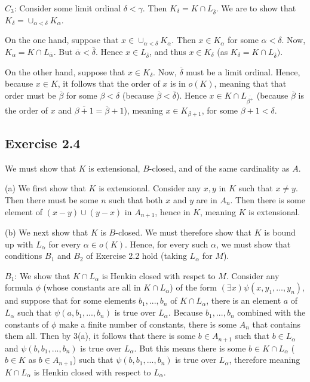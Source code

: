 \documentclass{article}
\theoremstyle{definition}
\begin{document}
$C_3$: Consider some limit ordinal $\delta<\gamma$. Then $K_\delta=K\cap L_{\overline{\delta}}$. We are to show that 
$K_\delta=\cup_{\alpha<\delta}K_\alpha$.

On the one hand, suppose that $x\in\cup_{\alpha<\delta}K_\alpha$. Then $x\in K_\alpha$ for some $\alpha<\delta$. Now, 
$K_\alpha=K\cap L_{\overline{\alpha}}$. But $\overline{\alpha}<\overline{\delta}$. Hence $x\in L_{\overline{\delta}}$, and thus 
$x\in K_\delta$ (as $K_\delta=K\cap L_{\overline{\delta}})$. 

On the other hand, suppose that $x\in K_\delta$. Now, $\overline{\delta}$ must be a limit ordinal. Hence, because 
$x\in K$, it follows that the order of $x$ is in $o(K)$, meaning that that order must be $\overline{\beta}$ for some $\beta<\delta$ (because 
$\overline{\beta}<\overline{\delta}$). 
Hence $x\in K\cap L_{\overline{\beta^+}}$ (because $\overline{\beta}$ is the order of $x$ and $\overline{\beta+1}=\overline{\beta}+1$), 
meaning $x\in K_{\beta+1}$, for some $\beta+1<\delta$.

\subsection*{Exercise 2.4}
We must show that $K$ is extensional, $B$-closed, and of the same cardinality as $A$.

(a) We first show that $K$ is extensional. Consider any $x,y$ in $K$ such that $x\ne y$. Then there must be some $n$ such that 
both $x$ and $y$ are in $A_n$. Then there is some element of $(x-y)\cup (y-x)$ in $A_{n+1}$, hence in $K$, meaning 
$K$ is extensional.

(b) We next show that $K$ is $B$-closed. We must therefore show that $K$ is bound up with $L_\alpha$ for every $\alpha\in o(K)$. Hence, for 
every such $\alpha$, we must show that conditions $B_1$ and $B_2$ of Exercise 2.2 hold (taking $L_\alpha$ for $M$).

$B_1$: We show that $K\cap L_\alpha$ is Henkin closed with respct to $M$. 
Consider any formula $\phi$ (whose constants are all in $K\cap L_\alpha$) 
of the form $(\exists x)\psi(x,y_1,...,y_n)$, and 
suppose that for some elements $b_1,...,b_n$ of $K\cap L_\alpha$, there is an element $a$ of $L_\alpha$ such 
that $\psi(a,b_1,...,b_n)$ is true over $L_\alpha$. Because $b_1,...,b_n$ combined with the constants of 
$\phi$ make a finite number of constants, there is some $A_n$ that contains them all. Then by 3(a), it follows that there is some 
$b\in A_{n+1}$ such that $b\in L_\alpha$ and $\psi(b,b_1,...,b_n)$ is true over $L_\alpha$. But this means there is some 
$b\in K\cap L_\alpha$ ($b\in K$ as $b\in A_{n+1}$) such that $\psi(b,b_1,...,b_n)$ is true over $L_\alpha$, therefore meaning 
$K\cap L_\alpha$ is Henkin closed with respect to $L_\alpha$.
\end{document}
